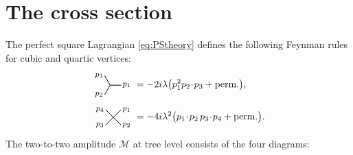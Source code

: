 \documentclass[pra,aps,amsmath,amssymb,notitlepage, twocolumn,superscriptaddress,longbibliography,nofootinbib,floatfix,10pt]{revtex4-2}
\begin{document}
\section{The cross section}\label{app:cross_section}
The perfect square Lagrangian \eqref{eq:PStheory} defines the following Feynman rules for cubic and quartic vertices:
\begin{align}
    \begin{tikzpicture}[line width=0.7,scale=0.2,baseline={([yshift=-0.5ex]current bounding box.center)}]
		\draw[] (0,0)--(2,0)node[right,xshift=-2]{\footnotesize$p_1$};
		\draw[] (0,0)--++(120:2)node[left,xshift=2]{\footnotesize$p_3$};
		\draw[] (0,0)--++(240:2)node[left,xshift=2]{\footnotesize$p_2$};
	\end{tikzpicture}
    &= -2i\lambda\bigl( p_1^2 p_2\!\cdot\!p_3 + \text{perm.} \bigr), \\
    \begin{tikzpicture}[line width=0.7,scale=0.2,baseline={([yshift=-0.5ex]current bounding box.center)}]
		\draw[] (0,0)--++(45:2)node[right,xshift=-2]{\footnotesize$p_1$};
        \draw[] (0,0)--++(-45:2)node[right,xshift=-2]{\footnotesize$p_2$};
		\draw[] (0,0)--++(-135:2)node[left,xshift=2]{\footnotesize$p_3$};
		\draw[] (0,0)--++(135:2)node[left,xshift=2]{\footnotesize$p_4$};
	\end{tikzpicture}
    &= -4i\lambda^2\bigl( p_1\!\cdot\!p_2 \, p_3\!\cdot\!p_4 + \text{perm.} \bigr).
\end{align}
The two-to-two amplitude $\mathcal{M}$ at tree level consists of the four diagrams:
\end{document}
